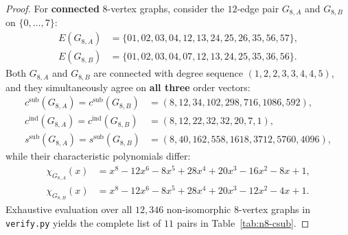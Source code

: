\documentclass[11pt]{article}
\theoremstyle{definition}
\newcommand{\cind}{c^{\mathrm{ind}}}
\newcommand{\csub}{c^{\mathrm{sub}}}
\newcommand{\ssub}{s^{\mathrm{sub}}}
\begin{document}
\begin{proof}
For \textbf{connected} $8$-vertex graphs, consider the $12$-edge pair $G_{8,A}$ and $G_{8,B}$ on $\{0,\dots,7\}$:
\begin{align*}
  E(G_{8,A}) &= \{01, 02, 03, 04, 12, 13, 24, 25, 26, 35, 56, 57\},\\
  E(G_{8,B}) &= \{01, 02, 03, 04, 07, 12, 13, 24, 25, 35, 36, 56\}.
\end{align*}
Both $G_{8,A}$ and $G_{8,B}$ are connected with degree sequence $(1,2,2,3,3,4,4,5)$, and they simultaneously agree on \textbf{all three} order vectors:
\begin{align*}
  \csub(G_{8,A}) = \csub(G_{8,B}) &= (8, 12, 34, 102, 298, 716, 1086, 592),\\
  \cind(G_{8,A}) = \cind(G_{8,B}) &= (8, 12, 22, 32, 32, 20, 7, 1),\\
  \ssub(G_{8,A}) = \ssub(G_{8,B}) &= (8, 40, 162, 558, 1618, 3712, 5760, 4096),
\end{align*}
while their characteristic polynomials differ:
\begin{align*}
  \chi_{G_{8,A}}(x) &= x^8 - 12x^6 - 8x^5 + 28x^4 + 20x^3 - 16x^2 - 8x + 1,\\
  \chi_{G_{8,B}}(x) &= x^8 - 12x^6 - 8x^5 + 28x^4 + 20x^3 - 12x^2 - 4x + 1.
\end{align*}
Exhaustive evaluation over all $12{,}346$ non-isomorphic $8$-vertex graphs in \texttt{verify.py} yields the complete list of $11$ pairs in Table~\ref{tab:n8-csub}.
\end{proof}
\end{document}
